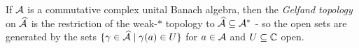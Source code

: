 \begin{defn} If $\mathcal{A}$ is a commutative complex unital Banach algebra, then the \emph{Gelfand topology} on $\widehat{\mathcal{A}}$ is the restriction of the weak-$*$ topology to $\widehat{\mathcal{A}} \subseteq \mathcal{A}^*$ - so the open sets are generated by the sets $\{\gamma \in \widehat{\mathcal{A}} \mid \gamma(a) \in U\}$ for $a \in \mathcal{A}$ and $U \subseteq \mathbb{C}$ open.
\end{defn}

